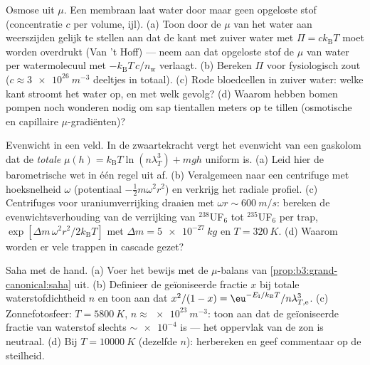 \begin{exercise}[$\star\star$]\label{exo:b3:grand-canonical:8}
Osmose uit $\mu$. Een membraan laat water door maar geen opgeloste stof
(concentratie $c$ per volume, ijl). (a) Toon door de $\mu$ van het water
aan weerszijden gelijk te stellen aan dat de kant met zuiver water met
$\Pi = ck_{\text{B}}T$ moet worden overdrukt (Van 't Hoff) --- neem aan dat
opgeloste stof de $\mu$ van water per watermolecuul met
$-k_{\text{B}}T\,c/n_{\text{w}}$ verlaagt. (b) Bereken $\Pi$ voor
fysiologisch zout ($c \approx \qty{3e26}{m^{-3}}$ deeltjes in totaal). (c)
Rode bloedcellen in zuiver water: welke kant stroomt het water op, en met
welk gevolg? (d) Waarom hebben bomen pompen noch wonderen nodig om sap
tientallen meters op te tillen (osmotische en capillaire $\mu$-gradiënten)?
\end{exercise}

\begin{exercise}[$\star\star$]\label{exo:b3:grand-canonical:9}
Evenwicht in een veld. In de zwaartekracht vergt het evenwicht van een
gaskolom dat de \emph{totale}  $\mu(h) =
k_{\text{B}}T\ln(n\lambda_T^3) + mgh$ uniform is. (a) Leid hier de
barometrische wet in één regel uit af. (b) Veralgemeen naar een centrifuge
met hoeksnelheid $\omega$ (potentiaal $-\tfrac12 m\omega^2r^2$) en verkrijg
het radiale profiel. (c) Centrifuges voor uraniumverrijking draaien met
$\omega r \sim
\qty{600}{m/s}$: bereken de evenwichtsverhouding van de
verrijking van $^{238}$UF$_6$ tot $^{235}$UF$_6$ per trap, $\exp[\Delta m\,\omega^2
r^2/2k_{\text{B}}T]$ met $\Delta m = \qty{5e-27}{kg}$ en $T =
\qty{320}{K}$. (d) Waarom worden er vele trappen in cascade gezet?
\end{exercise}

\begin{exercise}[$\star\star\star$]\label{exo:b3:grand-canonical:10}
Saha met de hand. (a) Voer het bewijs met de $\mu$-balans van
\cref{prop:b3:grand-canonical:saha} uit. (b) Definieer de geïoniseerde
fractie $x$ bij totale waterstofdichtheid $n$ en toon aan dat $x^2/(1 - x)
= \eu^{-E_{\text{I}}/k_{\text{B}}T}/n\lambda_{T,\text{e}}^3$. (c)
Zonnefotosfeer: $T = \qty{5800}{K}$, $n \approx
\qty{e23}{m^{-3}}$: toon
aan dat de geïoniseerde fractie van waterstof slechts $\sim\num{e-4}$ is
--- het oppervlak van de zon is neutraal. (d) Bij $T =
\qty{10000}{K}$
(dezelfde $n$): herbereken en geef commentaar op de steilheid.
\end{exercise}

